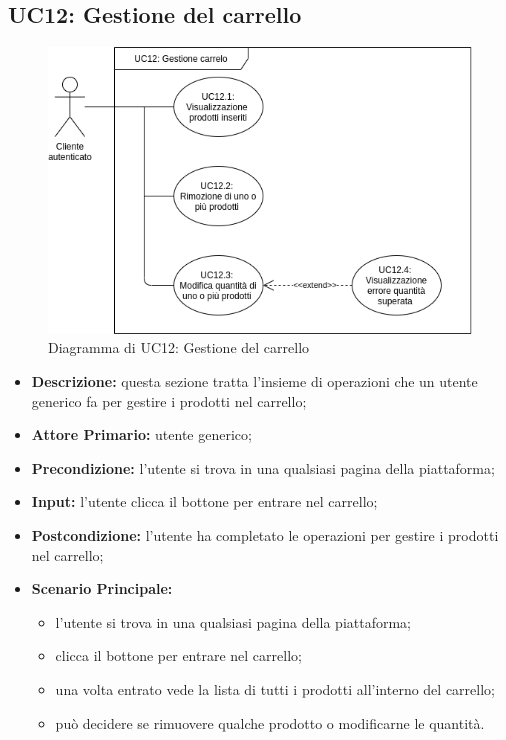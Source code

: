 \subsection{UC12: Gestione del carrello}
        \begin{figure}[!ht]
            \caption{Diagramma di UC12: Gestione del carrello}
            \vspace{10px}
            \includegraphics[scale=0.5]{../../../Images/AnalisiRequisiti/UC12}
            \centering
        \end{figure}
        \begin{itemize}
            \item \textbf{Descrizione:} questa sezione tratta l'insieme di operazioni che un utente generico fa per gestire i prodotti nel carrello;
            \item \textbf{Attore Primario:} utente generico;
            \item \textbf{Precondizione:} l'utente si trova in una qualsiasi pagina della piattaforma;
            \item \textbf{Input:} l'utente clicca il bottone per entrare nel carrello;
            \item \textbf{Postcondizione:} l'utente ha completato le operazioni per gestire i prodotti nel carrello;
            \item \textbf{Scenario Principale:}
                \begin{itemize}
                    \item l'utente si trova in una qualsiasi pagina della piattaforma;
                    \item clicca il bottone per entrare nel carrello;
                    \item una volta entrato vede la lista di tutti i prodotti all'interno del carrello;
                    \item può decidere se rimuovere qualche prodotto o modificarne le quantità.
                \end{itemize}
        \end{itemize}
